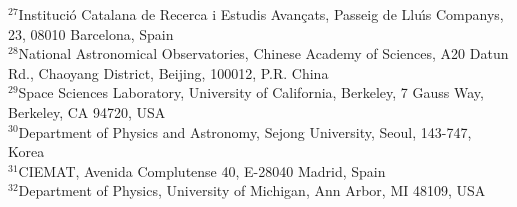 {$^{27}$Instituci\'{o} Catalana de Recerca i Estudis Avan\c{c}ats, Passeig de Llu\'{\i}s Companys, 23, 08010 Barcelona, Spain\\
$^{28}$National Astronomical Observatories, Chinese Academy of Sciences, A20 Datun Rd., Chaoyang District, Beijing, 100012, P.R. China\\
$^{29}$Space Sciences Laboratory, University of California, Berkeley, 7 Gauss Way, Berkeley, CA 94720, USA\\
$^{30}$Department of Physics and Astronomy, Sejong University, Seoul, 143-747, Korea\\
$^{31}$CIEMAT, Avenida Complutense 40, E-28040 Madrid, Spain\\
$^{32}$Department of Physics, University of Michigan, Ann Arbor, MI 48109, USA
}
